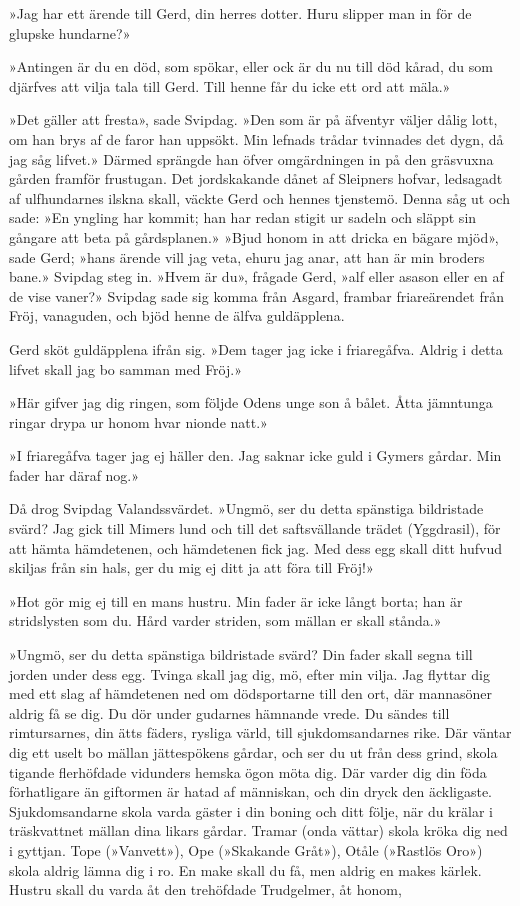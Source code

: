 »Jag har ett ärende till Gerd, din herres dotter. Huru slipper man in
för de glupske hundarne?»

»Antingen är du en död, som spökar, eller ock är du nu till död kårad,
du som djärfves att vilja tala till Gerd. Till henne får du icke ett ord
att mäla.»

»Det gäller att fresta», sade Svipdag. »Den som är på äfventyr väljer
dålig lott, om han brys af de faror han uppsökt. Min lefnads trådar
tvinnades det dygn, då jag såg lifvet.» Därmed sprängde han öfver
omgärdningen in på den gräsvuxna gården framför frustugan. Det
jordskakande dånet af Sleipners hofvar, ledsagadt af ulfhundarnes ilskna
skall, väckte Gerd och hennes tjenstemö. Denna såg ut och sade: »En
yngling har kommit; han har redan stigit ur sadeln och släppt sin
gångare att beta på gårdsplanen.» »Bjud honom in att dricka en bägare
mjöd», sade Gerd; »hans ärende vill jag
veta, ehuru jag anar, att han är min broders bane.» Svipdag steg in.
»Hvem är du», frågade Gerd, »alf eller asason eller en af de vise
vaner?» Svipdag sade sig komma från Asgard, frambar friareärendet från
Fröj, vanaguden, och bjöd henne de älfva guldäpplena.

Gerd sköt guldäpplena ifrån sig. »Dem tager jag icke i friaregåfva.
Aldrig i detta lifvet skall jag bo samman med Fröj.»

»Här gifver jag dig ringen, som följde Odens unge son å bålet. Åtta
jämntunga ringar drypa ur honom hvar nionde natt.»

»I friaregåfva tager jag ej häller den. Jag saknar icke guld i Gymers
gårdar. Min fader har däraf nog.»

Då drog Svipdag Valandssvärdet. »Ungmö, ser du detta spänstiga
bildristade svärd? Jag gick till Mimers lund och till det saftsvällande
trädet (Yggdrasil), för att hämta hämdetenen, och hämdetenen fick jag.
Med dess egg skall ditt hufvud skiljas från sin hals, ger du mig ej ditt
ja att föra till Fröj!»

»Hot gör mig ej till en mans hustru. Min fader är icke långt borta; han
är stridslysten som du. Hård varder striden, som mällan er skall
stånda.»

»Ungmö, ser du detta spänstiga bildristade svärd? Din fader skall segna
till jorden under dess egg. Tvinga skall jag dig, mö, efter min vilja.
Jag flyttar dig med ett slag af hämdetenen ned om dödsportarne till den
ort, där mannasöner aldrig få se dig. Du dör under gudarnes hämnande
vrede. Du sändes till rimtursarnes, din ätts fäders, rysliga värld, till
sjukdomsandarnes rike. Där väntar dig ett uselt bo mällan jättespökens
gårdar, och ser du ut från dess grind, skola tigande flerhöfdade
vidunders hemska ögon möta dig. Där varder dig din föda förhatligare än
giftormen är hatad af människan, och din dryck den äckligaste.
Sjukdomsandarne skola varda gäster i din boning och ditt följe, när du
krälar i träskvattnet mällan dina likars gårdar. Tramar (onda vättar)
skola kröka dig ned i gyttjan. Tope (»Vanvett»), Ope (»Skakande Gråt»),
Otåle (»Rastlös Oro») skola aldrig lämna dig i ro. En make skall du få,
men aldrig en makes kärlek. Hustru skall du varda åt den trehöfdade
Trudgelmer, åt honom,

